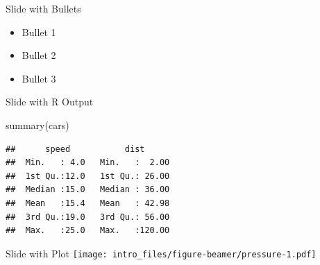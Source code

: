 \documentclass[
  ignorenonframetext,
]{beamer}
\newenvironment{Shaded}{\begin{snugshade}}{\end{snugshade}}
\newcommand{\FunctionTok}[1]{\textcolor[rgb]{0.00,0.00,0.00}{#1}}
\newcommand{\NormalTok}[1]{#1}
\providecommand{\tightlist}{%
  \setlength{\itemsep}{0pt}\setlength{\parskip}{0pt}}
\begin{document}
\begin{frame}{Slide with Bullets}
\protect\hypertarget{slide-with-bullets}{}
\begin{itemize}
\tightlist
\item
  Bullet 1
\item
  Bullet 2
\item
  Bullet 3
\end{itemize}
\end{frame}

\begin{frame}[fragile]{Slide with R Output}
\protect\hypertarget{slide-with-r-output}{}
\begin{Shaded}
\begin{Highlighting}[]
\FunctionTok{summary}\NormalTok{(cars)}
\end{Highlighting}
\end{Shaded}

\begin{verbatim}
##      speed           dist       
##  Min.   : 4.0   Min.   :  2.00  
##  1st Qu.:12.0   1st Qu.: 26.00  
##  Median :15.0   Median : 36.00  
##  Mean   :15.4   Mean   : 42.98  
##  3rd Qu.:19.0   3rd Qu.: 56.00  
##  Max.   :25.0   Max.   :120.00
\end{verbatim}
\end{frame}

\begin{frame}{Slide with Plot}
\protect\hypertarget{slide-with-plot}{}
\texttt{[image: intro\_files/figure-beamer/pressure-1.pdf]}
\end{frame}
\end{document}
